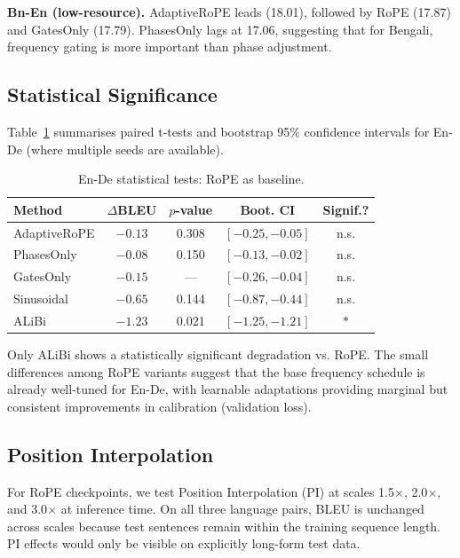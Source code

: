 \documentclass[conference]{IEEEtran}
\begin{document}
\textbf{Bn-En (low-resource).} AdaptiveRoPE leads (18.01), followed by RoPE
(17.87) and GatesOnly (17.79). PhasesOnly lags at 17.06, suggesting that for
Bengali, frequency gating is more important than phase adjustment.

\subsection{Statistical Significance}

Table~\ref{tab:stats} summarises paired t-tests and bootstrap 95\% confidence
intervals for En-De (where multiple seeds are available).

\begin{table}[htbp]
  \caption{En-De statistical tests: RoPE as baseline.}
  \label{tab:stats}
  \centering
  \begin{tabular}{lcccc}
    \toprule
    \textbf{Method} & $\Delta$BLEU & $p$-value & Boot. CI & Signif.? \\
    \midrule
    AdaptiveRoPE & $-0.13$ & 0.308 & $[-0.25, -0.05]$ & n.s. \\
    PhasesOnly & $-0.08$ & 0.150 & $[-0.13, -0.02]$ & n.s. \\
    GatesOnly & $-0.15$ & --- & $[-0.26, -0.04]$ & n.s. \\
    Sinusoidal & $-0.65$ & 0.144 & $[-0.87, -0.44]$ & n.s. \\
    ALiBi & $-1.23$ & 0.021 & $[-1.25, -1.21]$ & $*$ \\
    \bottomrule
  \end{tabular}
\end{table}

Only ALiBi shows a statistically significant degradation vs. RoPE. The small
differences among RoPE variants suggest that the base frequency schedule is
already well-tuned for En-De, with learnable adaptations providing marginal
but consistent improvements in calibration (validation loss).

\subsection{Position Interpolation}

For RoPE checkpoints, we test Position Interpolation (PI) \cite{chen2023extending}
at scales 1.5$\times$, 2.0$\times$, and 3.0$\times$ at inference time.
On all three language pairs, BLEU is unchanged across scales because test
sentences remain within the training sequence length. PI effects would only
be visible on explicitly long-form test data.
\end{document}
